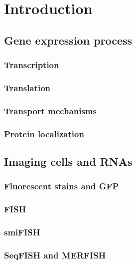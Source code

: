 
\graphicspath{{./figures/introduction/}}


\chapter{Introduction} \label{chap:introduction}
\minitoc
\newpage


\section{Gene expression process}


\subsection{Transcription}

\subsection{Translation}

\subsection{Transport mechanisms}

\subsection{Protein localization}


\section{Imaging cells and \ac{RNA}s}


\subsection{Fluorescent stains and \ac{GFP}}

\subsection{\ac{FISH}}

\subsection{\ac{smiFISH}}

\subsection{\ac{SeqFISH} and \ac{MERFISH}}


